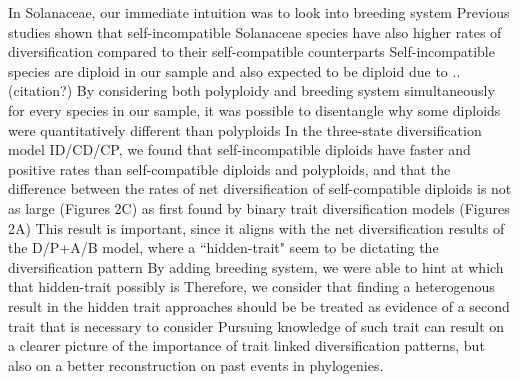 In Solanaceae, our immediate intuition was to look into breeding system
Previous studies shown that self-incompatible Solanaceae species have also higher rates of diversification compared to their self-compatible counterparts
Self-incompatible species are diploid in our sample and also expected to be diploid due to ..
(citation?)
By considering both polyploidy and breeding system simultaneously for every species in our sample, it was possible to disentangle why some diploids were quantitatively different than polyploids
In the three-state diversification model ID/CD/CP, we found that self-incompatible diploids have faster and positive rates than self-compatible diploids and polyploids, and that the difference between the  rates of net diversification of self-compatible diploids is not as large (Figures 2C) as first found by binary trait diversification models (Figures 2A)
This result is important, since it aligns with the net diversification results of the  D/P+A/B model, where a ``hidden-trait" seem to be dictating the diversification pattern
By adding breeding system, we were able to hint at which that hidden-trait possibly is
Therefore, we consider that finding a heterogenous result in the hidden trait approaches should be be treated as evidence of a second trait that is necessary to consider
Pursuing knowledge of  such trait can result on a clearer picture of the importance of trait linked diversification patterns, but also on a better reconstruction on past events in phylogenies.









%
